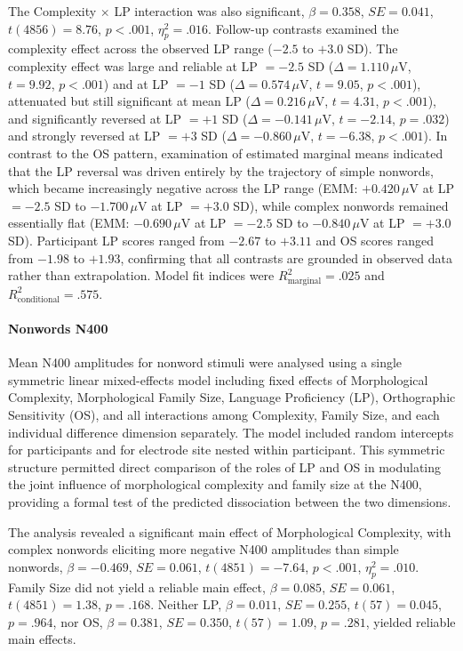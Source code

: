 \documentclass[utf8]{FrontiersinHarvard} %
\begin{document}
	The Complexity $\times$ LP interaction was also significant, $\beta = 0.358$, $SE = 0.041$, $t(4856) = 8.76$, $p < .001$, $\eta^2_p = .016$. Follow-up contrasts examined the complexity effect across the observed LP range ($-2.5$ to $+3.0$ SD). The complexity effect was large and reliable at LP $= -2.5$ SD ($\Delta = 1.110\,\mu$V, $t = 9.92$, $p < .001$) and at LP $= -1$ SD ($\Delta = 0.574\,\mu$V, $t = 9.05$, $p < .001$), attenuated but still significant at mean LP ($\Delta = 0.216\,\mu$V, $t = 4.31$, $p < .001$), and significantly reversed at LP $= +1$ SD ($\Delta = -0.141\,\mu$V, $t = -2.14$, $p = .032$) and strongly reversed at LP $= +3$ SD ($\Delta = -0.860\,\mu$V, $t = -6.38$, $p < .001$). In contrast to the OS pattern, examination of estimated marginal means indicated that the LP reversal was driven entirely by the trajectory of simple nonwords, which became increasingly negative across the LP range (EMM: $+0.420\,\mu$V at LP $= -2.5$ SD to $-1.700\,\mu$V at LP $= +3.0$ SD), while complex nonwords remained essentially flat (EMM: $-0.690\,\mu$V at LP $= -2.5$ SD to $-0.840\,\mu$V at LP $= +3.0$ SD). Participant LP scores ranged from $-2.67$ to $+3.11$ and OS scores ranged from $-1.98$ to $+1.93$, confirming that all contrasts are grounded in observed data rather than extrapolation. Model fit indices were $R^2_{\text{marginal}} = .025$ and $R^2_{\text{conditional}} = .575$.
	
	
	
	\paragraph*{Nonwords N400}
	Mean N400 amplitudes for nonword stimuli were analysed using a single symmetric linear mixed-effects model including fixed effects of Morphological Complexity, Morphological Family Size, Language Proficiency (LP), Orthographic Sensitivity (OS), and all interactions among Complexity, Family Size, and each individual difference dimension separately. The model included random intercepts for participants and for electrode site nested within participant. This symmetric structure permitted direct comparison of the roles of LP and OS in modulating the joint influence of morphological complexity and family size at the N400, providing a formal test of the predicted dissociation between the two dimensions.
	
	The analysis revealed a significant main effect of Morphological Complexity, with complex nonwords eliciting more negative N400 amplitudes than simple nonwords, $\beta = -0.469$, $SE = 0.061$, $t(4851) = -7.64$, $p < .001$, $\eta^2_p = .010$. Family Size did not yield a reliable main effect, $\beta = 0.085$, $SE = 0.061$, $t(4851) = 1.38$, $p = .168$. Neither LP, $\beta = 0.011$, $SE = 0.255$, $t(57) = 0.045$, $p = .964$, nor OS, $\beta = 0.381$, $SE = 0.350$, $t(57) = 1.09$, $p = .281$, yielded reliable main effects.
	
\end{document}
